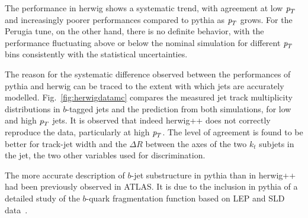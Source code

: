 
The performance in {\sc herwig} shows a systematic trend, with agreement at low ${\emph{p}_{T}}$ and increasingly poorer performances compared to {\sc pythia} as ${\emph{p}_{T}}$ grows. For the Perugia tune, on the other hand, there is no definite behavior, with the performance fluctuating above or below the nominal simulation for different ${\emph{p}_{T}}$ bins consistently with the statistical uncertainties.

The reason for the systematic difference observed between the performances of {\sc pythia} and {\sc herwig} can be traced to the extent with which jets are accurately modelled. Fig.~\ref{fig:herwigdatamc} compares the measured jet track multiplicity distributions in $b$-tagged jets and the prediction from both simulations, for low and high ${\emph{p}_{T}}$ jets. It is observed that indeed {\sc herwig++} does not correctly reproduce the data, particularly at high ${\emph{p}_{T}}$. The level of agreement is found to be better for track-jet width and the $\Delta R$ between the axes of the two $k_t$ subjets in the jet, the two other variables used for discrimination.


The more accurate description of $b$-jet substructure in {\sc pythia} than in {\sc herwig++} had been previously observed in ATLAS. It is due to the inclusion in {\sc pythia} of a detailed study of the $b$-quark fragmentation function based on LEP and SLD data~\cite{JESUncertainty}.







